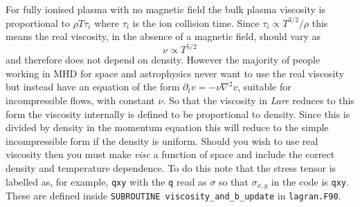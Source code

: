 \documentclass[11pt]{article}
\begin{document}
For fully ionised plasma with no magnetic field the bulk plasma viscosity is proportional to $\rho T \tau_i$ \cite{nrl} where $\tau_i$ is the ion collision time. Since $\tau_i \propto T^{3/2}/\rho$ this means the real viscosity, in the absence of a magnetic field, should vary as 
\begin{displaymath}
  \nu \propto T^{5/2}
\end{displaymath} 
and therefore does not depend on density. However the majority of people working in MHD for space and astrophysics never want to use the real viscosity but instead have an equation of the form $\partial_t v = - \nu \nabla^2 v$, suitable for incompressible flows, with constant $\nu$. So that the viscosity in {\it Lare} reduces to this form the viscosity internally is defined to be proportional to density. Since this is divided by density in the momentum equation this will reduce to the simple incompressible form if the density is uniform. Should you wish to use real viscosity then you must make {\it visc} a function of space and include the correct density and temperature dependence. To do this note that the stress tensor is labelled as, for example, \texttt{qxy} with the \texttt{q} read as $\sigma$ so that $\sigma_{x,y}$ in the code is \texttt{qxy}. These are defined inside \texttt{SUBROUTINE viscosity\_and\_b\_update} in \texttt{lagran.F90}. 
 
\end{document}
